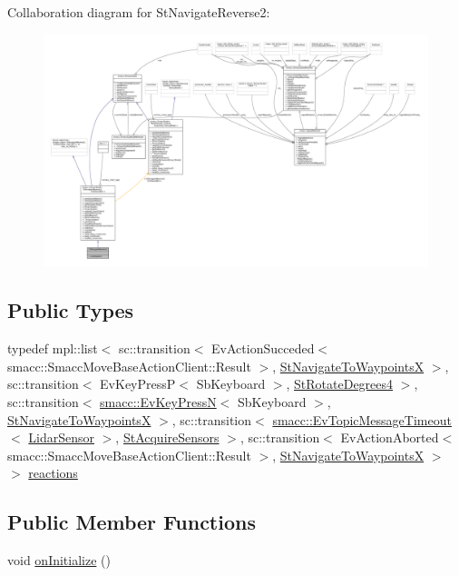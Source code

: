 Collaboration diagram for St\+Navigate\+Reverse2\+:
\nopagebreak
\begin{figure}[H]
\begin{center}
\leavevmode
\includegraphics[width=350pt]{structStNavigateReverse2__coll__graph}
\end{center}
\end{figure}
\subsection*{Public Types}
\begin{DoxyCompactItemize}
\item 
typedef mpl\+::list$<$ sc\+::transition$<$ Ev\+Action\+Succeded$<$ smacc\+::\+Smacc\+Move\+Base\+Action\+Client\+::\+Result $>$, \hyperlink{structStNavigateToWaypointsX}{St\+Navigate\+To\+WaypointsX} $>$, sc\+::transition$<$ Ev\+Key\+PressP$<$ Sb\+Keyboard $>$, \hyperlink{structStRotateDegrees4}{St\+Rotate\+Degrees4} $>$, sc\+::transition$<$ \hyperlink{structsmacc_1_1EvKeyPressN}{smacc\+::\+Ev\+Key\+PressN}$<$ Sb\+Keyboard $>$, \hyperlink{structStNavigateToWaypointsX}{St\+Navigate\+To\+WaypointsX} $>$, sc\+::transition$<$ \hyperlink{structsmacc_1_1EvTopicMessageTimeout}{smacc\+::\+Ev\+Topic\+Message\+Timeout}$<$ \hyperlink{sensor__state_8h_a9db9e1944f88de79507758d08e4a2ee3}{Lidar\+Sensor} $>$, \hyperlink{structStAcquireSensors}{St\+Acquire\+Sensors} $>$, sc\+::transition$<$ Ev\+Action\+Aborted$<$ smacc\+::\+Smacc\+Move\+Base\+Action\+Client\+::\+Result $>$, \hyperlink{structStNavigateToWaypointsX}{St\+Navigate\+To\+WaypointsX} $>$ $>$ \hyperlink{structStNavigateReverse2_a1a38b381a26ffbaa5f9dc81cd604c3b6}{reactions}
\end{DoxyCompactItemize}
\subsection*{Public Member Functions}
\begin{DoxyCompactItemize}
\item 
void \hyperlink{structStNavigateReverse2_ac5c81b2766cc7716242d6f71c8b0ea8c}{on\+Initialize} ()
\end{DoxyCompactItemize}
